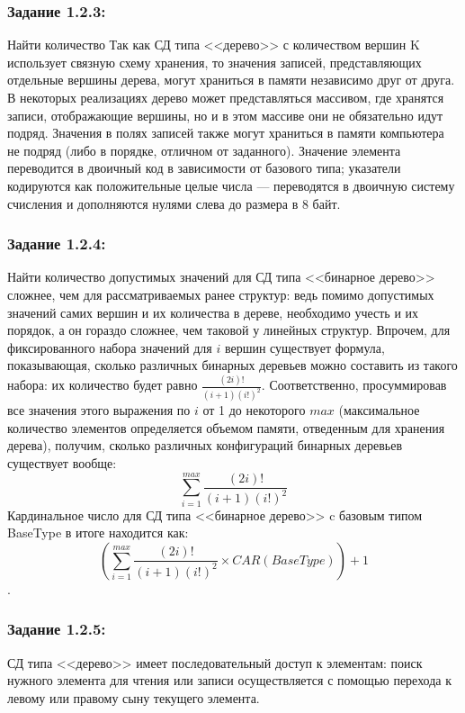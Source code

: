 \documentclass[12pt]{article}
\begin{document}
{	\subsubsection{Задание 1.2.3:}
	\label{task_1_2_3}
	Найти количество 
	Так как СД типа <<дерево>> с количеством вершин K использует связную схему хранения, то значения записей, представляющих отдельные вершины дерева, могут храниться в памяти независимо друг от друга. В некоторых реализациях дерево может представляться массивом, где хранятся записи, отображающие вершины, но и в этом массиве они не обязательно идут подряд. Значения в полях записей также могут храниться в памяти компьютера не подряд (либо в порядке, отличном от заданного). Значение элемента переводится в двоичный код в зависимости от базового типа; указатели кодируются как положительные целые числа --- переводятся в двоичную систему счисления и дополняются нулями слева до размера в 8 байт.

	\subsubsection{Задание 1.2.4:}
	\label{task_1_2_4}
	
	Найти количество допустимых значений для СД типа <<бинарное дерево>> сложнее, чем для рассматриваемых ранее структур: ведь помимо допустимых значений самих вершин и их количества в дереве, необходимо учесть и их порядок, а он гораздо сложнее, чем таковой у линейных структур. Впрочем, для фиксированного набора значений для $i$ вершин существует формула, показывающая, сколько различных бинарных деревьев можно составить из такого набора: их количество будет равно $\frac{(2i)!}{(i + 1)(i!)^2}$. Соответственно, просуммировав все значения этого выражения по $i$ от 1 до некоторого $max$ (максимальное количество элементов определяется объемом памяти, отведенным для хранения дерева), получим, сколько различных конфигураций бинарных деревьев существует вообще: $$\sum_{i = 1}^{max}{\frac{(2i)!}{(i + 1)(i!)^2}}$$ Кардинальное число для СД типа <<бинарное дерево>> c базовым типом BaseType в итоге находится как: $$(\sum_{i = 1}^{max}{\frac{(2i)!}{(i + 1)(i!)^2}} \times CAR(BaseType)) + 1$$.
	
	\subsubsection{Задание 1.2.5:}
	\label{task_1_2_5}
	СД типа <<дерево>> имеет последовательный доступ к элементам: поиск нужного элемента для чтения или записи осуществляется с помощью перехода к левому или правому сыну текущего элемента. 
	
}
\end{document}
